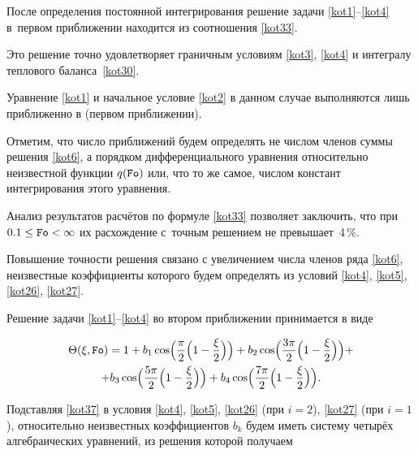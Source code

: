 После определения постоянной интегрирования решение задачи \eqref{kot1}--\eqref{kot4} в~первом приближении находится из соотношения \eqref{kot33}.

Это решение точно удовлетворяет граничным условиям \eqref{kot3}, \eqref{kot4} и интегралу теплового баланса~\eqref{kot30}.

Уравнение \eqref{kot1} и начальное условие \eqref{kot2} в данном случае выполняются лишь приближенно в (первом приближении).

Отметим, что число приближений будем определять не числом членов суммы решения \eqref{kot6}, а порядком дифференциального уравнения относительно неизвестной функции $q(\mbox{\tt Fo})$ или, что то же самое, числом констант интегрирования этого уравнения.



Анализ результатов расчётов по формуле \eqref{kot33} позволяет заключить, что при $0.1\le\mbox{\tt Fo}<\infty$ их расхождение с~точным решением \cite{kot:bib15} не превышает~4\,\%.

Повышение точности решения связано с увеличением числа членов ряда \eqref{kot6}, неизвестные коэффициенты которого будем определять из условий \eqref{kot4}, \eqref{kot5}, \eqref{kot26}, \eqref{kot27}.



Решение задачи \eqref{kot1}--\eqref{kot4} во втором приближении принимается в виде

\begin{multline}

\label{kot37}

\Theta(\xi,\mbox{\tt Fo})=1+b_1\cos\Bigl(\frac \pi 2 \Bigl(1-\frac \xi 2\Bigr)\Bigr)+

b_2\cos\Bigl(\frac{3\pi} 2 \Bigl(1-\frac \xi 2\Bigr)\Bigr)+ 

\\

+

b_3\cos\Bigl(\frac{5\pi} 2 \Bigl(1-\frac \xi 2\Bigr)\Bigr)+

b_4\cos\Bigl(\frac{7\pi} 2 \Bigl(1-\frac \xi 2\Bigr)\Bigr).

\end{multline}



Подставляя \eqref{kot37} в условия \eqref{kot4}, \eqref{kot5}, \eqref{kot26} (при $i=2$), \eqref{kot27} (при $i=1$), относительно неизвестных коэффициентов $b_k$ будем иметь систему четырёх алгебраических уравнений, из решения которой получаем

